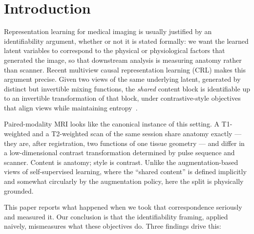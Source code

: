 \documentclass[11pt]{article}
\begin{document}
\section{Introduction}

Representation learning for medical imaging is usually justified by an
identifiability argument, whether or not it is stated formally: we want the
learned latent variables to correspond to the physical or physiological factors
that generated the image, so that downstream analysis is measuring anatomy
rather than scanner. Recent multiview causal representation learning (CRL) makes
this argument precise. Given two views of the same underlying latent, generated
by distinct but invertible mixing functions, the \emph{shared} content block is
identifiable up to an invertible transformation of that block, under
contrastive-style objectives that align views while maintaining
entropy~\citep{yao2024multiview,vonkugelgen2021self,daunhawer2023identifiability}.

Paired-modality MRI looks like the canonical instance of this setting. A
T1-weighted and a T2-weighted scan of the same session share anatomy exactly ---
they are, after registration, two functions of one tissue geometry --- and
differ in a low-dimensional contrast transformation determined by pulse sequence
and scanner. Content is anatomy; style is contrast. Unlike the augmentation-based
views of self-supervised learning, where the ``shared content'' is defined
implicitly and somewhat circularly by the augmentation policy, here the split is
physically grounded.

This paper reports what happened when we took that correspondence seriously and
measured it. Our conclusion is that the identifiability framing, applied
naively, mismeasures what these objectives do. Three findings drive this:
\end{document}
